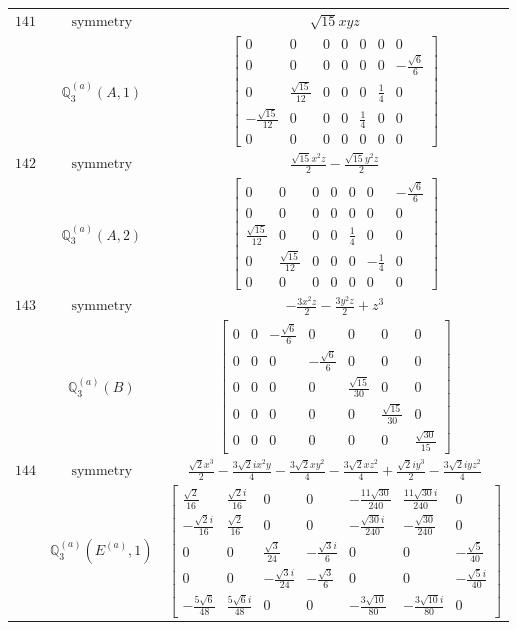 \documentclass[fleqn,8pt,landscape]{jsarticle}
\begin{document}
\begin{longtable}{ccc}
$ 141 $ & $ \text{symmetry} $ & $ \sqrt{15} x y z $ \\
$  $ & $ \mathbb{Q}_{3}^{(a)}(A,1) $ & $ \begin{bmatrix} 0 & 0 & 0 & 0 & 0 & 0 & 0 \\ 0 & 0 & 0 & 0 & 0 & 0 & - \frac{\sqrt{6}}{6} \\ 0 & \frac{\sqrt{15}}{12} & 0 & 0 & 0 & \frac{1}{4} & 0 \\ - \frac{\sqrt{15}}{12} & 0 & 0 & 0 & \frac{1}{4} & 0 & 0 \\ 0 & 0 & 0 & 0 & 0 & 0 & 0 \end{bmatrix} $ \\ \hline
$ 142 $ & $ \text{symmetry} $ & $ \frac{\sqrt{15} x^{2} z}{2} - \frac{\sqrt{15} y^{2} z}{2} $ \\
$  $ & $ \mathbb{Q}_{3}^{(a)}(A,2) $ & $ \begin{bmatrix} 0 & 0 & 0 & 0 & 0 & 0 & - \frac{\sqrt{6}}{6} \\ 0 & 0 & 0 & 0 & 0 & 0 & 0 \\ \frac{\sqrt{15}}{12} & 0 & 0 & 0 & \frac{1}{4} & 0 & 0 \\ 0 & \frac{\sqrt{15}}{12} & 0 & 0 & 0 & - \frac{1}{4} & 0 \\ 0 & 0 & 0 & 0 & 0 & 0 & 0 \end{bmatrix} $ \\ \hline
$ 143 $ & $ \text{symmetry} $ & $ - \frac{3 x^{2} z}{2} - \frac{3 y^{2} z}{2} + z^{3} $ \\
$  $ & $ \mathbb{Q}_{3}^{(a)}(B) $ & $ \begin{bmatrix} 0 & 0 & - \frac{\sqrt{6}}{6} & 0 & 0 & 0 & 0 \\ 0 & 0 & 0 & - \frac{\sqrt{6}}{6} & 0 & 0 & 0 \\ 0 & 0 & 0 & 0 & \frac{\sqrt{15}}{30} & 0 & 0 \\ 0 & 0 & 0 & 0 & 0 & \frac{\sqrt{15}}{30} & 0 \\ 0 & 0 & 0 & 0 & 0 & 0 & \frac{\sqrt{30}}{15} \end{bmatrix} $ \\ \hline
$ 144 $ & $ \text{symmetry} $ & $ \frac{\sqrt{2} x^{3}}{2} - \frac{3 \sqrt{2} i x^{2} y}{4} - \frac{3 \sqrt{2} x y^{2}}{4} - \frac{3 \sqrt{2} x z^{2}}{4} + \frac{\sqrt{2} i y^{3}}{2} - \frac{3 \sqrt{2} i y z^{2}}{4} $ \\
$  $ & $ \mathbb{Q}_{3}^{(a)}(E^{(a)},1) $ & $ \begin{bmatrix} \frac{\sqrt{2}}{16} & \frac{\sqrt{2} i}{16} & 0 & 0 & - \frac{11 \sqrt{30}}{240} & \frac{11 \sqrt{30} i}{240} & 0 \\ - \frac{\sqrt{2} i}{16} & \frac{\sqrt{2}}{16} & 0 & 0 & - \frac{\sqrt{30} i}{240} & - \frac{\sqrt{30}}{240} & 0 \\ 0 & 0 & \frac{\sqrt{3}}{24} & - \frac{\sqrt{3} i}{6} & 0 & 0 & - \frac{\sqrt{5}}{40} \\ 0 & 0 & - \frac{\sqrt{3} i}{24} & - \frac{\sqrt{3}}{6} & 0 & 0 & - \frac{\sqrt{5} i}{40} \\ - \frac{5 \sqrt{6}}{48} & \frac{5 \sqrt{6} i}{48} & 0 & 0 & - \frac{3 \sqrt{10}}{80} & - \frac{3 \sqrt{10} i}{80} & 0 \end{bmatrix} $ \\ \hline

\end{longtable}
\end{document}

